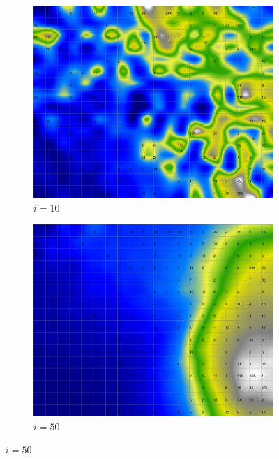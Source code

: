 \documentclass{acm_proc_article-sp}
\begin{document}
\begin{figure}
\centering
    \centering
    \begin{subfigure}[b]{0.24\linewidth}
        \includegraphics[width=\linewidth]{img/wine-newmid-smoothed-data-histogram-i-10}
        \caption{$i=10$}
        \label{fig:wine-newmid-smoothed-data-histogram-i-10}
    \end{subfigure}
    \begin{subfigure}[b]{0.24\linewidth}
        \includegraphics[width=\linewidth]{img/wine-newmid-smoothed-data-histogram-i-50}
        \caption{$i=50$}
        \label{fig:wine-newmid-smoothed-data-histogram-i-50}

\end{subfigure}
\end{figure}
\end{document}
